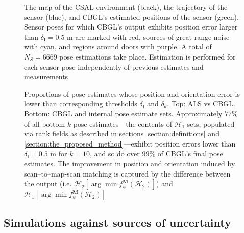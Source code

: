 \begin{figure}
  
  \vspace{-0.7cm}
  \caption{\small The map of the CSAL environment (black), the trajectory of
           the sensor (blue), and CBGL's estimated positions of the sensor
           (green). Sensor poses for which CBGL's output exhibits position error
           larger than $\delta_{\bm{l}} = 0.5$ m are marked with red, sources
           of great range noise with cyan, and regions around doors with
           purple. A total of $N_S = 6669$ pose estimations take place.
           Estimation is performed for each sensor pose independently of
           previous estimates and measurements}
  \vspace{-0.5cm}
  \label{fig:a:map_and_trajectory}
\end{figure}

\begin{figure}
  \vspace{-0.4cm}
  
  \vspace{0.01cm}
  \caption{\small Proportions of pose estimates whose position and orientation
           error is lower than corresponding thresholds $\delta_{\bm{l}}$ and
           $\delta_{\theta}$. Top: ALS vs CBGL. Bottom: CBGL and internal pose
           estimate sets.  Approximately $77\%$ of all bottom-$k$ pose
           estimates---the contents of $\mathcal{H}_1$ sets, populated via rank
           fields as described in sections \ref{section:definitions} and
           \ref{section:the_proposed_method}---exhibit position errors lower
           than $\delta_{\bm{l}} = 0.5$ m for $k=10$, and so do over $99\%$ of
           CBGL's final pose estimates. The improvement in position and
           orientation induced by scan--to--map-scan matching is captured by
           the difference between the output (i.e.  $\mathcal{H}_2[\arg \min
           f_{\psi}^{\bm{M}}(\mathcal{H}_2)]$) and $\mathcal{H}_1[\arg \min
           f_{\psi}^{\bm{M}}(\mathcal{H}_2)]$}
  \vspace{-0.5cm}
  \label{fig:a:awesomeness}
\end{figure}


\subsection{Simulations against sources of uncertainty}
\label{subsec:exp_b}

